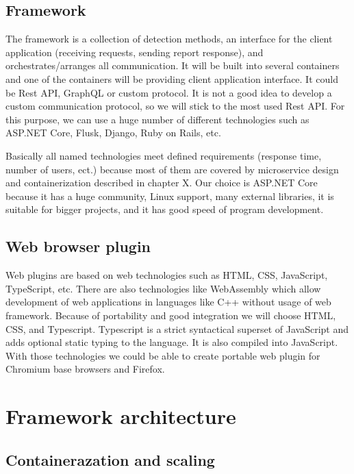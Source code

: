 \section{Framework}

The framework is a collection of detection methods, an interface for the client application (receiving requests, sending report response), and orchestrates/arranges all communication. It will be built into several containers and one of the containers will be providing client application interface. It could be Rest API, GraphQL or custom protocol. It is not a good idea to develop a custom communication protocol, so we will stick to the most used Rest API. For this purpose, we can use a huge number of different technologies such as ASP.NET Core, Flusk, Django, Ruby on Rails, etc.

Basically all named technologies meet defined requirements (response time, number of users, ect.) because most of them are covered by microservice design and containerization described in chapter X. Our choice is ASP.NET Core because it has a huge community, Linux support, many external libraries, it is suitable for bigger projects, and it has good speed of program development.

\section{Web browser plugin}

Web plugins are based on web technologies such as HTML, CSS, JavaScript, TypeScript, etc. There are also technologies like WebAssembly which allow development of web applications in languages like C++ without usage of web framework. Because of portability and good integration we will choose HTML, CSS, and Typescript. Typescript is a strict syntactical superset of JavaScript and adds optional static typing to the language. It is also compiled into JavaScript. With those technologies we could be able to create portable web plugin for Chromium base browsers and Firefox.


\chapter{Framework architecture}

\section{Containerazation and scaling}

